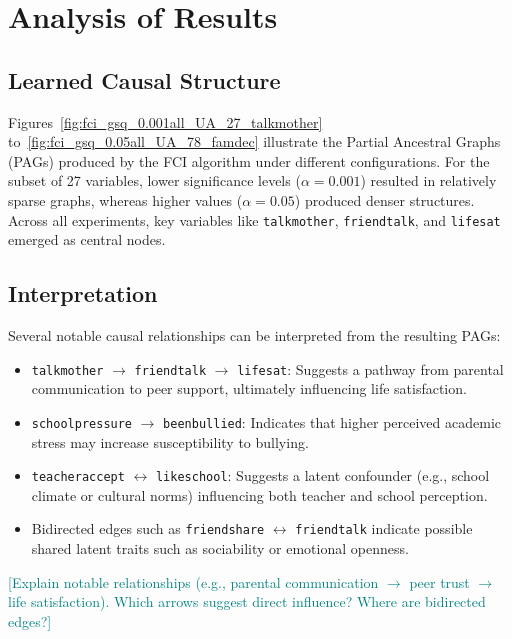 \documentclass[main.tex]{subfiles}
\begin{document}
\section{Analysis of Results}

\subsection{Learned Causal Structure}
% 
% 
Figures~\ref{fig:fci_gsq_0.001all_UA_27_talkmother} to~\ref{fig:fci_gsq_0.05all_UA_78_famdec} illustrate the Partial Ancestral Graphs (PAGs) produced by the FCI algorithm under different configurations. For the subset of 27 variables, lower significance levels ($\alpha=0.001$) resulted in relatively sparse graphs, whereas higher values ($\alpha=0.05$) produced denser structures. Across all experiments, key variables like \texttt{talkmother}, \texttt{friendtalk}, and \texttt{lifesat} emerged as central nodes.

\begin{landscape}

\end{landscape}



\subsection{Interpretation}
Several notable causal relationships can be interpreted from the resulting PAGs:
\begin{itemize}
    \item \texttt{talkmother} $\rightarrow$ \texttt{friendtalk} $\rightarrow$ \texttt{lifesat}: Suggests a pathway from parental communication to peer support, ultimately influencing life satisfaction.
    \item \texttt{schoolpressure} $\rightarrow$ \texttt{beenbullied}: Indicates that higher perceived academic stress may increase susceptibility to bullying.
    \item \texttt{teacheraccept} $\leftrightarrow$ \texttt{likeschool}: Suggests a latent confounder (e.g., school climate or cultural norms) influencing both teacher and school perception.
    \item Bidirected edges such as \texttt{friendshare} $\leftrightarrow$ \texttt{friendtalk} indicate possible shared latent traits such as sociability or emotional openness.
\end{itemize}
\textcolor{teal}{[Explain notable relationships (e.g., parental communication $\rightarrow$ peer trust $\rightarrow$ life satisfaction). Which arrows suggest direct influence? Where are bidirected edges?]}
\end{document}
